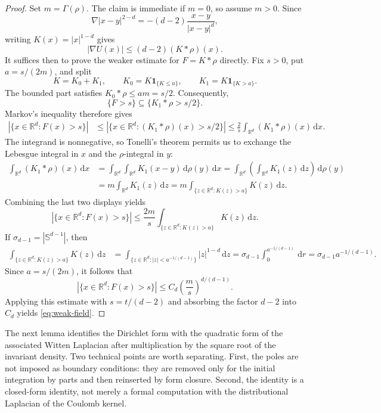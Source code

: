 \documentclass[12pt,reqno,letterpaper]{amsart}
\theoremstyle{definition}
\theoremstyle{remark}
\numberwithin{equation}{section}
\newcommand{\R}{\mathbb R}
\newcommand{\dd}{\,\mathrm d}
\begin{document}
\begin{proof}
Set \(m=\Gamma(\rho)\).  The claim is immediate if \(m=0\), so assume
\(m>0\).  Since
\[
 \nabla |x-y|^{2-d}
 =-(d-2)\frac{x-y}{|x-y|^d},
\]
writing \(K(x)=|x|^{1-d}\) gives
\begin{equation*}
 |\nabla U(x)|
 \le(d-2)(K*\rho)(x).
\end{equation*}
It suffices then to prove the weaker estimate for \(F=K*\rho\) directly.  Fix \(s>0\), put
\(a=s/(2m)\), and split
\[
 K=K_0+K_1,
 \qquad K_0=K\mathbf1_{\{K\le a\}},
 \qquad K_1=K\mathbf1_{\{K>a\}}.
\]
The bounded part satisfies \(K_0*\rho\le am=s/2\).  Consequently,
\[
 \{F>s\}\subseteq\{K_1*\rho>s/2\}.
\]
Markov's inequality therefore gives
\begin{align*}
 |\{x\in\R^d:F(x)>s\}|
 &\le|\{x\in\R^d:(K_1*\rho)(x)>s/2\}|\le \frac2s\int_{\R^d}(K_1*\rho)(x)\dd x.
\end{align*}
The integrand is nonnegative, so Tonelli's theorem permits us to exchange the
Lebesgue integral in \(x\) and the \(\rho\)-integral in \(y\):
\begin{align*}
 \int_{\R^d}(K_1*\rho)(x)\dd x
 &=\int_{\R^d}\int_{\R^d}K_1(x-y)\dd\rho(y)\dd x=\int_{\R^d}\left(\int_{\R^d}K_1(z)\dd z\right)\dd\rho(y)\\
 &=m\int_{\R^d}K_1(z)\dd z
 =m\int_{\{z\in\R^d:K(z)>a\}}K(z)\dd z.
\end{align*}
Combining the last
two displays yields
\[
 |\{x\in\R^d:F(x)>s\}|
 \le\frac{2m}{s}
 \int_{\{z\in\R^d:K(z)>a\}}K(z)\dd z.
\]
If \(\sigma_{d-1}=|\mathbb S^{d-1}|\), then
\begin{align*}
 \int_{\{z\in\R^d:K(z)>a\}}K(z)\dd z
 &=\int_{\{z\in\R^d:|z|<a^{-1/(d-1)}\}}|z|^{1-d}\dd z=\sigma_{d-1}\int_0^{a^{-1/(d-1)}}\dd r
 =\sigma_{d-1}a^{-1/(d-1)}.
\end{align*}
Since \(a=s/(2m)\), it follows that
\[
 |\{x\in\R^d:F(x)>s\}|
 \le C_d\left(\frac{m}{s}\right)^{d/(d-1)}.
\]
Applying this estimate with \(s=t/(d-2)\) and absorbing the factor \(d-2\)
into \(C_d\) yields \eqref{eq:weak-field}.
\end{proof}

The next lemma identifies the Dirichlet form with the quadratic form of the
associated Witten Laplacian after multiplication by the square root of the
invariant density.  Two technical points are worth separating.  First, the
poles are not imposed as boundary conditions: they are removed only for the
initial integration by parts and then reinserted by form closure.  Second, the
identity is a closed-form identity, not merely a formal computation with the
distributional Laplacian of the Coulomb kernel.
\end{document}
